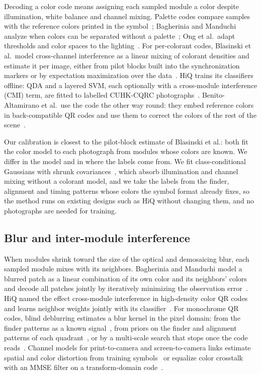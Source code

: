 Decoding a color code means assigning each sampled module a color despite illumination,
white balance and channel mixing. Palette codes compare samples with the reference colors
printed in the symbol~\cite{grillo2010hcc2d,berchtold2020jab}; Bagherinia and Manduchi
analyze when colors can be separated without a palette~\cite{bagherinia2011theory}; Ong et
al.\ adapt thresholds and color spaces to the lighting~\cite{ong2011mmcc}. For
per-colorant codes, Blasinski et al.\ model cross-channel interference as a linear mixing
of colorant densities and estimate it per image, either from pilot blocks built into the
synchronization markers or by expectation maximization over the
data~\cite{blasinski2013pccc,bulan2012em}. HiQ trains its classifiers offline: QDA and a
layered SVM, each optionally with a cross-module interference (CMI) term, are fitted to
labelled CUHK-CQRC photographs~\cite{yang2018hiq}. Benito-Altamirano et al.\ use the
code the other way round: they embed reference colors in back-compatible QR codes and use
them to correct the colors of the rest of the scene~\cite{benito2023backcompat}.

Our calibration is closest to the pilot-block estimate of Blasinski et al.: both fit the
color model to each photograph from modules whose colors are known. We differ in the model
and in where the labels come from. We fit class-conditional Gaussians with shrunk
covariances~\cite{friedman1989rda}, which absorb illumination and channel mixing without a
colorant model, and we take the labels from the finder, alignment and timing patterns whose colors the
symbol format already fixes, so the method runs on existing designs such as HiQ without
changing them, and no photographs are needed for training.

\subsection{Blur and inter-module interference}

When modules shrink toward the size of the optical and demosaicing blur, each sampled
module mixes with its neighbors. Bagherinia and Manduchi model a blurred patch as a linear
combination of its own color and its neighbors' colors and decode all patches jointly by
iteratively minimizing the observation error~\cite{bagherinia2014blur}. HiQ named the effect
cross-module interference in high-density color QR codes and learns neighbor weights
jointly with its classifier~\cite{yang2018hiq}. For monochrome QR codes, blind deblurring
estimates a blur kernel in the pixel domain: from the finder patterns as a known
signal~\cite{vangennip2015deblur}, from priors on the finder and alignment patterns of each
quadrant~\cite{zheng2024positioning}, or by a multi-scale search that stops once the code
reads~\cite{chen2021scale}. Channel models for print-to-camera and screen-to-camera links
estimate spatial and color distortion from training symbols~\cite{zhang2019printcapture} or
equalize color crosstalk with an MMSE filter on a transform-domain
code~\cite{fujihashi2021mimo}.

